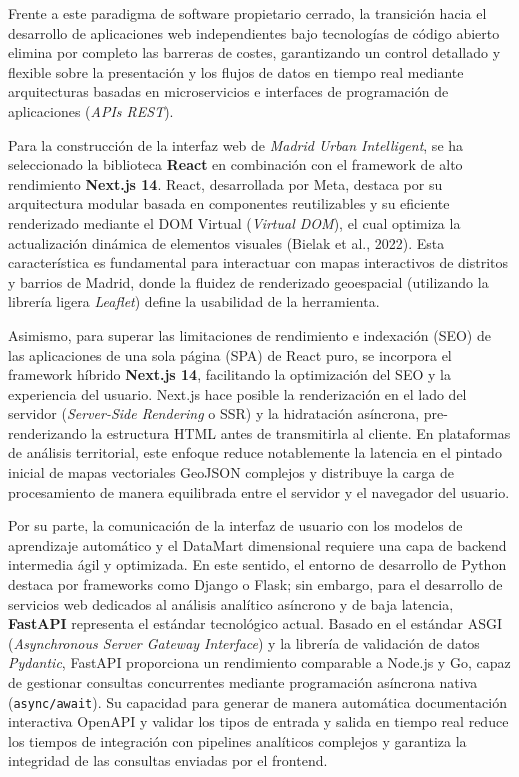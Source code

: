 \documentclass[a4paper,11pt,openany]{book}
\begin{document}
Frente a este paradigma de software propietario cerrado, la transición hacia el desarrollo de aplicaciones web independientes bajo tecnologías de código abierto elimina por completo las barreras de costes, garantizando un control detallado y flexible sobre la presentación y los flujos de datos en tiempo real mediante arquitecturas basadas en microservicios e interfaces de programación de aplicaciones (\textit{APIs REST}).

Para la construcción de la interfaz web de \textit{Madrid Urban Intelligent}, se ha seleccionado la biblioteca \textbf{React} en combinación con el framework de alto rendimiento \textbf{Next.js 14}. React, desarrollada por Meta, destaca por su arquitectura modular basada en componentes reutilizables y su eficiente renderizado mediante el DOM Virtual (\textit{Virtual DOM}), el cual optimiza la actualización dinámica de elementos visuales (Bielak et al., 2022). Esta característica es fundamental para interactuar con mapas interactivos de distritos y barrios de Madrid, donde la fluidez de renderizado geoespacial (utilizando la librería ligera \textit{Leaflet}) define la usabilidad de la herramienta.

Asimismo, para superar las limitaciones de rendimiento e indexación (SEO) de las aplicaciones de una sola página (SPA) de React puro, se incorpora el framework híbrido \textbf{Next.js 14}, facilitando la optimización del SEO y la experiencia del usuario. Next.js hace posible la renderización en el lado del servidor (\textit{Server-Side Rendering} o SSR) y la hidratación asíncrona, pre-renderizando la estructura HTML antes de transmitirla al cliente. En plataformas de análisis territorial, este enfoque reduce notablemente la latencia en el pintado inicial de mapas vectoriales GeoJSON complejos y distribuye la carga de procesamiento de manera equilibrada entre el servidor y el navegador del usuario.

Por su parte, la comunicación de la interfaz de usuario con los modelos de aprendizaje automático y el DataMart dimensional requiere una capa de backend intermedia ágil y optimizada. En este sentido, el entorno de desarrollo de Python destaca por frameworks como Django o Flask; sin embargo, para el desarrollo de servicios web dedicados al análisis analítico asíncrono y de baja latencia, \textbf{FastAPI} representa el estándar tecnológico actual. Basado en el estándar ASGI (\textit{Asynchronous Server Gateway Interface}) y la librería de validación de datos \textit{Pydantic}, FastAPI proporciona un rendimiento comparable a Node.js y Go, capaz de gestionar consultas concurrentes mediante programación asíncrona nativa (\texttt{async/await}). Su capacidad para generar de manera automática documentación interactiva OpenAPI y validar los tipos de entrada y salida en tiempo real reduce los tiempos de integración con pipelines analíticos complejos y garantiza la integridad de las consultas enviadas por el frontend.
\end{document}
